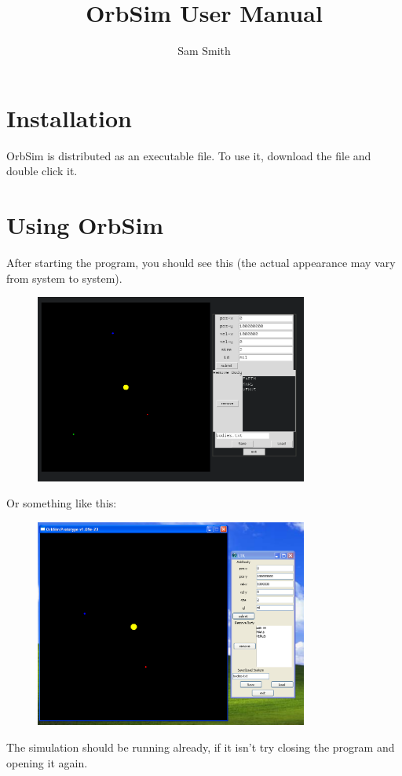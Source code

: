 \documentclass[a4paper,11pt,titlepage]{article}
\author{Sam Smith}
\title{OrbSim User Manual}
\date{ }
\begin{document}
\maketitle
\tableofcontents
\clearpage

\section{Installation}
OrbSim is distributed as an executable file. To use it, download the file and
double click it.

\section{Using OrbSim}

After starting the program, you should see this (the actual appearance may vary
from system to system).
\begin{figure}[H]
	\centering
	\includegraphics[width=0.8\textwidth]{../img/start.png}
\end{figure}

Or something like this:

\begin{figure}[H]
	\centering
	\includegraphics[width=0.8\textwidth]{../img/win.png}
\end{figure}
The simulation should be running already, if it isn't try closing the program
and opening it again.
\end{document}
